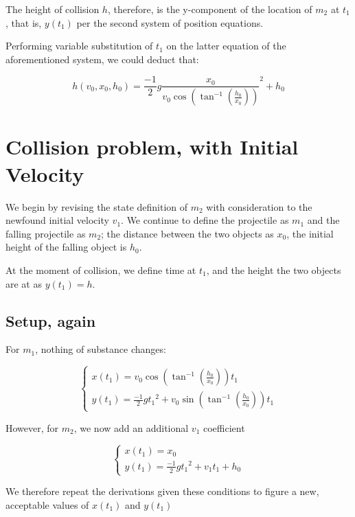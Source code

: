 \documentclass[letterpaper]{article}
\begin{document}
The height of collision \(h\), therefore, is the y-component of the location of \(m_2\) at \(t_1\), that is, \(y(t_1)\) per the second system of position equations.

Performing variable substitution of \(t_1\) on the latter equation of the aforementioned system, we could deduct that:

\begin{equation}
    h(v_0, x_0, h_0) = \frac{-1}{2}g{\frac{x_0}{v_0\cos(\tan^{-1}(\frac{h_0}{x_0}))}}^2 + h_0
\end{equation}

\section{Collision problem, with Initial Velocity}
\label{sec:org3898522}
We begin by revising the state definition of \(m_2\) with consideration to the newfound initial velocity \(v_1\). We continue to define the projectile as \(m_1\) and the falling projectile as \(m_2\); the distance between the two objects as \(x_0\), the initial height of the falling object is \(h_0\).

At the moment of collision, we define time at \(t_1\), and the height the two objects are at as \(y(t_1) = h\).

\subsection{Setup, again}
\label{sec:orgf133030}
For \(m_1\), nothing of substance changes:

\begin{equation}
    \begin{cases}
        x(t_1) = v_0\cos(\tan^{-1}(\frac{h_0}{x_0}))t_1 \\
        y(t_1) = \frac{-1}{2}g {t_1}^2 + v_0\sin(\tan^{-1}(\frac{h_0}{x_0})) t_1
    \end{cases}
\end{equation}

However, for \(m_2\), we now add an additional \(v_1\) coefficient

\begin{equation}
    \begin{cases}
        x(t_1) = x_0 \\
        y(t_1) = \frac{-1}{2}g{t_1}^2 + v_1t_1 + h_0
    \end{cases}
\end{equation}

We therefore repeat the derivations given these conditions to figure a new, acceptable values of \(x(t_1)\) and \(y(t_1)\)
\end{document}
